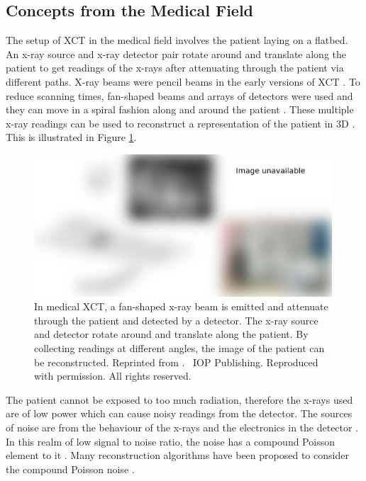 \subsection{Concepts from the Medical Field}

The setup of XCT \citep{cormack1973reconstruction, hounsfield1973computerized, hounsfield1980computed} in the medical field involves the patient laying on a flatbed. An x-ray source and x-ray detector pair rotate around and translate along the patient to get readings of the x-rays after attenuating through the patient via different paths. X-ray beams were pencil beams in the early versions of XCT \citep{michael2001x}. To reduce scanning times, fan-shaped beams and arrays of detectors were used and they can move in a spiral fashion along and around the patient \citep{cierniak2011x}. These multiple x-ray readings can be used to reconstruct a representation of the patient in 3D \citep{zeng2010medical}. This is illustrated in Figure \ref{fig:literature_medicalct}.

\begin{figure}
  \centering
  \includegraphics[width=0.99\textwidth]{../figures/literatureReview/literature_medicalct.png}
  \caption{In medical XCT, a fan-shaped x-ray beam is emitted and attenuate through the patient and detected by a detector. The x-ray source and detector rotate around and translate along the patient. By collecting readings at different angles, the image of the patient can be reconstructed. Reprinted from \cite{michael2001x}. \textcopyright\ IOP Publishing. Reproduced with permission. All rights reserved.}
  \label{fig:literature_medicalct}
\end{figure}

The patient cannot be exposed to too much radiation, therefore the x-rays used are of low power which can cause noisy readings from the detector. The sources of noise are from the behaviour of the x-rays and the electronics in the detector \citep{yang2010noise}. In this realm of low signal to noise ratio, the noise has a compound Poisson element to it \citep{whiting2002signal, whiting2006properties}. Many reconstruction algorithms have been proposed to consider the compound Poisson noise \citep{elbakri2002statistical, elbakri2003efficient, elbakri2003statistical, lasio2007statistical, xie2008x}.

